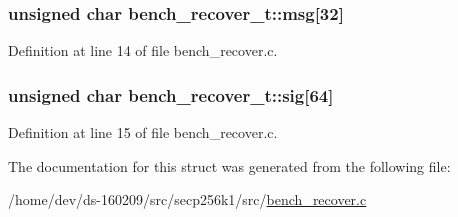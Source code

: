 \hypertarget{structbench__recover__t_ae1fb7111eb50d3b09ea073ffa61824ee}{}
\subsubsection[{msg}]{\setlength{\rightskip}{0pt plus 5cm}unsigned char bench\+\_\+recover\+\_\+t\+::msg\mbox{[}32\mbox{]}}\label{structbench__recover__t_ae1fb7111eb50d3b09ea073ffa61824ee}


Definition at line 14 of file bench\+\_\+recover.\+c.

\hypertarget{structbench__recover__t_a76d1266b30c8d6a55fd52e9bb7c67a85}{}
\subsubsection[{sig}]{\setlength{\rightskip}{0pt plus 5cm}unsigned char bench\+\_\+recover\+\_\+t\+::sig\mbox{[}64\mbox{]}}\label{structbench__recover__t_a76d1266b30c8d6a55fd52e9bb7c67a85}


Definition at line 15 of file bench\+\_\+recover.\+c.



The documentation for this struct was generated from the following file\+:\begin{DoxyCompactItemize}
\item 
/home/dev/ds-\/160209/src/secp256k1/src/\hyperlink{bench__recover_8c}{bench\+\_\+recover.\+c}\end{DoxyCompactItemize}
